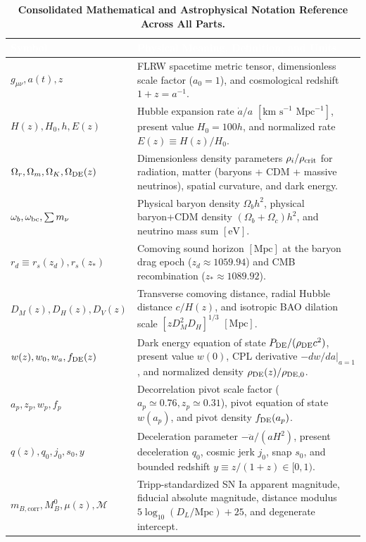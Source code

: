 \documentclass[aps,prd,preprint,superscriptaddress,nofootinbib]{revtex4-2}
\begin{document}
\begin{table}[!htbp]
\centering
\caption{\textbf{Consolidated Mathematical and Astrophysical Notation Reference Across All Parts.}}
\label{m:tab:notation_ref}
\footnotesize
\renewcommand{\arraystretch}{1.22}
\begin{tabularx}{\textwidth}{>{\bfseries\color{primary}}p{} X}
\toprule
\rowcolor{primary} \textcolor{white}{\textbf{Symbol}} & \textcolor{white}{\textbf{Physical Meaning, Definition, and Units}} \\
\midrule
$g_{\mu\nu}, a(t), z$ & FLRW spacetime metric tensor, dimensionless scale factor ($a_0 = 1$), and cosmological redshift $1+z = a^{-1}$. \\
$H(z), H_0, h, E(z)$ & Hubble expansion rate $\dot{a}/a$ $[\text{km s}^{-1}\text{ Mpc}^{-1}]$, present value $H_0 = 100h$, and normalized rate $E(z) \equiv H(z)/H_0$. \\
$\Omega_r, \Omega_m, \Omega_K, \Omega_{\rm DE}(z)$ & Dimensionless density parameters $\rho_i / \rho_{\rm crit}$ for radiation, matter (baryons + CDM + massive neutrinos), spatial curvature, and dark energy. \\
$\omega_b, \omega_{\rm bc}, \sum m_\nu$ & Physical baryon density $\Omega_b h^2$, physical baryon+CDM density $(\Omega_b+\Omega_c)h^2$, and neutrino mass sum $[\text{eV}]$. \\
$r_d \equiv r_s(z_d), r_s(z_*)$ & Comoving sound horizon $[\text{Mpc}]$ at the baryon drag epoch ($z_d \approx 1059.94$) and CMB recombination ($z_* \approx 1089.92$). \\
$D_M(z), D_H(z), D_V(z)$ & Transverse comoving distance, radial Hubble distance $c/H(z)$, and isotropic BAO dilation scale $[z D_M^2 D_H]^{1/3}$ $[\text{Mpc}]$. \\
$w(z), w_0, w_a, f_{\rm DE}(z)$ & Dark energy equation of state $P_{\rm DE}/(\rho_{\rm DE}c^2)$, present value $w(0)$, CPL derivative $-dw/da|_{a=1}$, and normalized density $\rho_{\rm DE}(z)/\rho_{\rm DE,0}$. \\
$a_p, z_p, w_p, f_p$ & Decorrelation pivot scale factor ($a_p \simeq 0.76, z_p \simeq 0.31$), pivot equation of state $w(a_p)$, and pivot density $f_{\rm DE}(a_p)$. \\
$q(z), q_0, j_0, s_0, y$ & Deceleration parameter $-\ddot{a}/(aH^2)$, present deceleration $q_0$, cosmic jerk $j_0$, snap $s_0$, and bounded redshift $y \equiv z/(1+z) \in [0,1)$. \\
$m_{B,\text{corr}}, M_B^0, \mu(z), \mathcal{M}$ & Tripp-standardized SN Ia apparent magnitude, fiducial absolute magnitude, distance modulus $5\log_{10}(D_L/\text{Mpc})+25$, and degenerate intercept. \\

\end{tabularx}
\end{table}
\end{document}
